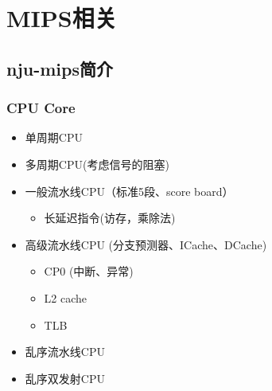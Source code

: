 \documentclass[lang=cn,11pt,a4paper]{elegantpaper}
\begin{document}
\section{MIPS相关}

\subsection{nju-mips简介}

\subsubsection{CPU Core}
\begin{itemize}
\item 单周期CPU
\item 多周期CPU(考虑信号的阻塞)
\item 一般流水线CPU（标准5段、score board）
\begin{itemize}
\item 长延迟指令(访存，乘除法)
\end{itemize}
\item 高级流水线CPU (分支预测器、ICache、DCache)
\begin{itemize}
\item CP0 (中断、异常)
\item L2 cache
\item TLB
\end{itemize}
\item 乱序流水线CPU
\item 乱序双发射CPU
\end{itemize}
\end{document}
